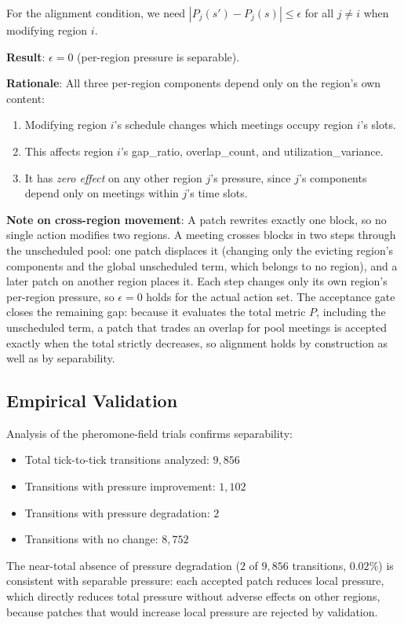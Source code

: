 For the alignment condition, we need $|P_j(s') - P_j(s)| \leq \epsilon$ for all $j \neq i$ when modifying region $i$.

\textbf{Result}: $\epsilon = 0$ (per-region pressure is separable).

\textbf{Rationale}: All three per-region components depend only on the region's own content:
\begin{enumerate}
\item Modifying region $i$'s schedule changes which meetings occupy region $i$'s slots.
\item This affects region $i$'s gap\_ratio, overlap\_count, and utilization\_variance.
\item It has \emph{zero effect} on any other region $j$'s pressure, since $j$'s components depend only on meetings within $j$'s time slots.
\end{enumerate}

\textbf{Note on cross-region movement}: A patch rewrites exactly one block, so no single action modifies two regions. A meeting crosses blocks in two steps through the unscheduled pool: one patch displaces it (changing only the evicting region's components and the global unscheduled term, which belongs to no region), and a later patch on another region places it. Each step changes only its own region's per-region pressure, so $\epsilon = 0$ holds for the actual action set. The acceptance gate closes the remaining gap: because it evaluates the total metric $P$, including the unscheduled term, a patch that trades an overlap for pool meetings is accepted exactly when the total strictly decreases, so alignment holds by construction as well as by separability.

\subsection{Empirical Validation}

Analysis of the pheromone-field trials confirms separability:
\begin{itemize}
\item Total tick-to-tick transitions analyzed: $9{,}856$
\item Transitions with pressure improvement: $1{,}102$
\item Transitions with pressure degradation: $2$
\item Transitions with no change: $8{,}752$
\end{itemize}

The near-total absence of pressure degradation ($2$ of $9{,}856$ transitions, $0.02\%$) is consistent with separable pressure: each accepted patch reduces local pressure, which directly reduces total pressure without adverse effects on other regions, because patches that would increase local pressure are rejected by validation.

